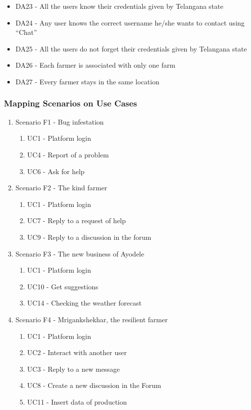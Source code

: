 \begin{enumerate}[label=\textbf{G.\arabic*}]
\begin{enumerate} [label=\textbf{G.4.\arabic*}]
\begin{itemize} [label =]
            \item DA23 - All the users know their credentials given by Telangana state
            \item DA24 - Any user knows the correct username he/she wants to contact using “Chat”
            \item DA25 - All the users do not forget their credentials given by Telangana state
            \item DA26 - Each farmer is associated with only one farm
            \item DA27 - Every farmer stays in the same location
        \end{itemize}
    \end{enumerate}
\end{enumerate}

\subsubsection{Mapping Scenarios on Use Cases}
\begin{enumerate}[label=]
    \item Scenario F1 - Bug infestation
    \begin{enumerate}[label=]
        \item UC1 - Platform login
        \item UC4 - Report of a problem
        \item UC6 - Ask for help
    \end{enumerate}
    \item Scenario F2 - The kind farmer
    \begin{enumerate}[label=]
        \item UC1 - Platform login
        \item UC7 - Reply to a request of help
        \item UC9 - Reply to a discussion in the forum
    \end{enumerate}
    \item Scenario F3 - The new business of Ayodele
    \begin{enumerate}[label=]
        \item UC1 - Platform login
        \item UC10 - Get suggestions
        \item UC14 - Checking the weather forecast
    \end{enumerate}
    \item Scenario F4 - Mrigankshekhar, the resilient farmer
    \begin{enumerate}[label=]
        \item UC1 - Platform login
        \item UC2 - Interact with another user
        \item UC3 - Reply to a new message
        \item UC8 - Create a new discussion in the Forum
        \item UC11 - Insert data of production
    \end{enumerate}
\end{enumerate}
